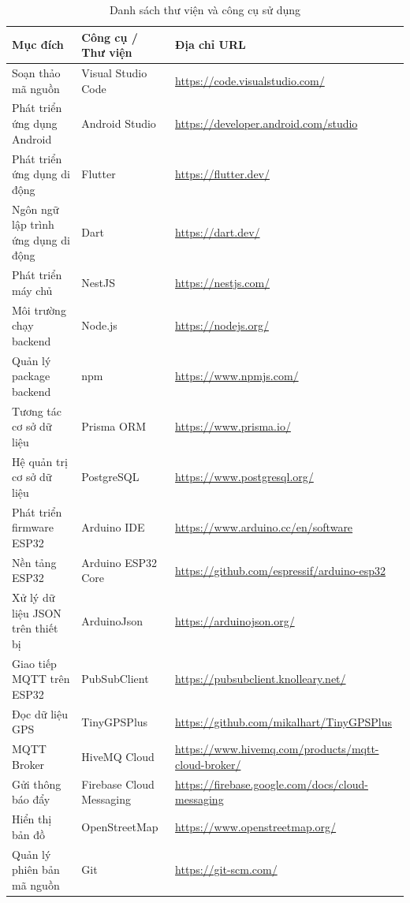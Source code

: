 \documentclass[../DoAn.tex]{subfiles}
\begin{document}
\begin{table}[H]
\centering
\small
\begin{tabular}{|p{3cm}|p{3.2cm}|p{7cm}|}
\hline
\textbf{Mục đích} & \textbf{Công cụ / Thư viện} & \textbf{Địa chỉ URL} \\
\hline
Soạn thảo mã nguồn & Visual Studio Code & \url{https://code.visualstudio.com/} \\
\hline
Phát triển ứng dụng Android & Android Studio & \url{https://developer.android.com/studio} \\
\hline
Phát triển ứng dụng di động & Flutter & \url{https://flutter.dev/} \\
\hline
Ngôn ngữ lập trình ứng dụng di động & Dart & \url{https://dart.dev/} \\
\hline
Phát triển máy chủ & NestJS & \url{https://nestjs.com/} \\
\hline
Môi trường chạy backend & Node.js & \url{https://nodejs.org/} \\
\hline
Quản lý package backend & npm & \url{https://www.npmjs.com/} \\
\hline
Tương tác cơ sở dữ liệu & Prisma ORM & \url{https://www.prisma.io/} \\
\hline
Hệ quản trị cơ sở dữ liệu & PostgreSQL & \url{https://www.postgresql.org/} \\
\hline
Phát triển firmware ESP32 & Arduino IDE & \url{https://www.arduino.cc/en/software} \\
\hline
Nền tảng ESP32 & Arduino ESP32 Core & \url{https://github.com/espressif/arduino-esp32} \\
\hline
Xử lý dữ liệu JSON trên thiết bị & ArduinoJson & \url{https://arduinojson.org/} \\
\hline
Giao tiếp MQTT trên ESP32 & PubSubClient & \url{https://pubsubclient.knolleary.net/} \\
\hline
Đọc dữ liệu GPS & TinyGPSPlus & \url{https://github.com/mikalhart/TinyGPSPlus} \\
\hline
MQTT Broker & HiveMQ Cloud & \url{https://www.hivemq.com/products/mqtt-cloud-broker/} \\
\hline
Gửi thông báo đẩy & Firebase Cloud Messaging & \url{https://firebase.google.com/docs/cloud-messaging} \\
\hline
Hiển thị bản đồ & OpenStreetMap & \url{https://www.openstreetmap.org/} \\
\hline
Quản lý phiên bản mã nguồn & Git & \url{https://git-scm.com/} \\
\hline
\end{tabular}
\caption{Danh sách thư viện và công cụ sử dụng}
\label{table:tools_libraries}
\end{table}
\end{document}
